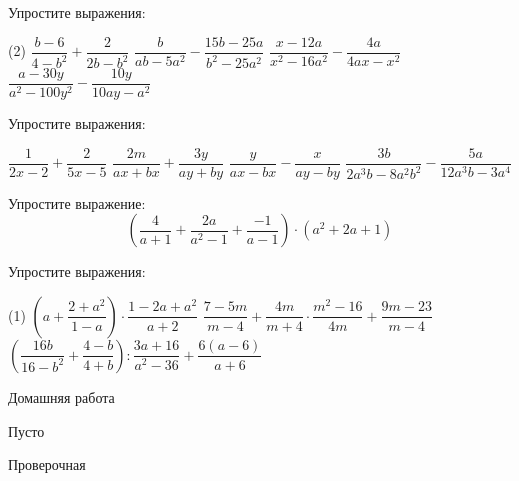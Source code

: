 \begin{class}[number=3]
	\begin{listofex}
		\item Упростите выражения:
		\begin{tasks}(2)
			\task \( \dfrac{b-6}{4-b^2}+\dfrac{2}{2b-b^2} \)
			\task \( \dfrac{b}{ab-5a^2}-\dfrac{15b-25a}{b^2-25a^2} \)
			\task \( \dfrac{x-12a}{x^2-16a^2}-\dfrac{4a}{4ax-x^2} \)
			\task \( \dfrac{a-30y}{a^2-100y^2}-\dfrac{10y}{10ay-a^2} \)
		\end{tasks}
		\item Упростите выражения:
		\begin{itasks}[2]
			\task \( \dfrac{1}{2x-2}+\dfrac{2}{5x-5} \)
			\task \( \dfrac{2m}{ax+bx}+\dfrac{3y}{ay+by} \)
			\task \( \dfrac{y}{ax-bx}-\dfrac{x}{ay-by} \)
			\task \( \dfrac{3b}{2a^3b-8a^2b^2}-\dfrac{5a}{12a^3b-3a^4} \)
		\end{itasks}
		\item Упростите выражение: \[ \left( \dfrac{4}{a+1}+\dfrac{2a}{a^2-1}+\dfrac{-1}{a-1} \right)\cdot(a^2+2a+1) \]
		\item Упростите выражения:
		\begin{tasks}(1)
			\task \( \left( a+\dfrac{2+a^2}{1-a} \right)\cdot\dfrac{1-2a+a^2}{a+2} \)
			\task \( \dfrac{7-5m}{m-4}+\dfrac{4m}{m+4}\cdot\dfrac{m^2-16}{4m}+\dfrac{9m-23}{m-4} \)
			\task \( \left( \dfrac{16b}{16-b^2}+\dfrac{4-b}{4+b} \right):\dfrac{3a+16}{a^2-36}+\dfrac{6(a-6)}{a+6} \)
		\end{tasks}
	\end{listofex}
\end{class}

\begin{homework}[number=3]
	\begin{listofex}
		\item Домашняя работа
	\end{listofex}
\end{homework}

\begin{class}[number=4]
	\begin{listofex}
		\item Пусто
	\end{listofex}
\end{class}


\begin{exam}
	\begin{listofex}
		\item Проверочная
	\end{listofex}
\end{exam}
